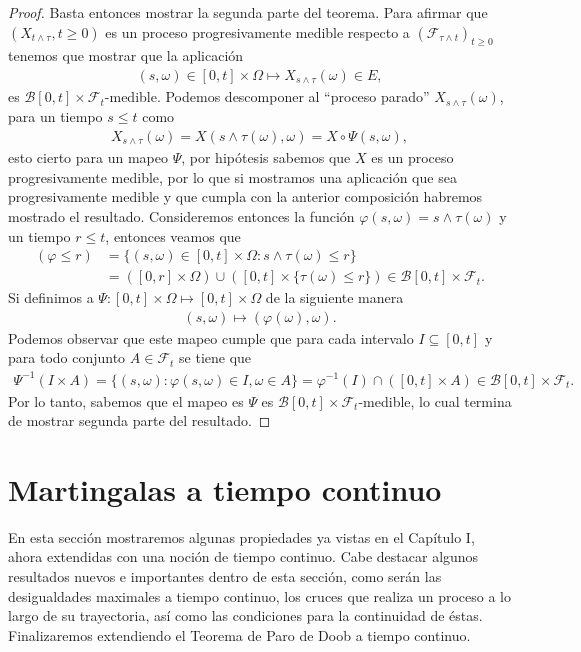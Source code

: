 \begin{proof}
Basta entonces mostrar la segunda parte del teorema. Para afirmar que $(X_{t \wedge \tau}, t \geq 0)$ es un proceso progresivamente medible respecto a $(\mathcal{F}_{\tau \wedge t})_{t \geq 0}$ tenemos que mostrar que la aplicación
\begin{align*}
	(s, \omega) \in [0, t] \times \Omega \mapsto X_{s \wedge \tau} (\omega) \in E,
\end{align*}
es $\mathcal{B}[0, t] \times \mathcal{F}_t$-medible. Podemos descomponer al ``proceso parado'' $X_{s \wedge \tau} (\omega)$, para un tiempo $s \leq t$ como
\begin{align*}
	X_{s \wedge \tau} (\omega) = X(s \wedge \tau (\omega), \omega) = X \circ \Psi (s, \omega),
\end{align*}
esto cierto para un mapeo $\Psi$, por hipótesis sabemos que $X$ es un proceso progresivamente medible, por lo que si mostramos una aplicación que sea progresivamente medible y que cumpla con la anterior composición habremos mostrado el resultado. Consideremos entonces la función $\varphi (s, \omega) = s \wedge \tau(\omega)$ y un tiempo $r \leq t$, entonces veamos que 
\begin{align*}
	(\varphi \leq r) & = \{ (s, \omega) \in [0, t] \times \Omega : s \wedge \tau(\omega) \leq r \} \\
    & = ([0, r] \times \Omega) \cup ([0, t] \times \{ \tau (\omega) \leq r \}) \in \mathcal{B}[0, t] \times \mathcal{F}_t.
\end{align*}
Si definimos a $\Psi: [0, t] \times \Omega \mapsto [0, t] \times \Omega$ de la siguiente manera
\begin{align*}
	(s, \omega) \mapsto (\varphi(\omega), \omega).
\end{align*}
Podemos observar que este mapeo cumple que para cada intervalo $I \subseteq [0, t]$ y para todo conjunto $A \in \mathcal{F}_t$ se tiene que
\begin{align*}
	\Psi^{-1}(I \times A) = \{ (s, \omega) : \varphi(s, \omega) \in I, \omega \in A \} = \varphi^{-1}(I) \cap ([0, t] \times A) \in \mathcal{B}[0, t] \times \mathcal{F}_t.
\end{align*}
Por lo tanto, sabemos que el mapeo es $\Psi$ es $\mathcal{B}[0, t] \times \mathcal{F}_t$-medible, lo cual termina de mostrar segunda parte del resultado.
\end{proof}

\section{Martingalas a tiempo continuo}
En esta sección mostraremos algunas propiedades ya vistas en el Capítulo I, ahora extendidas con una noción de tiempo continuo. Cabe destacar algunos resultados nuevos e importantes dentro de esta sección, como serán las desigualdades maximales a tiempo continuo, los cruces que realiza un proceso a lo largo de su trayectoria, así como las condiciones para la continuidad de éstas. Finalizaremos extendiendo el Teorema de Paro de Doob a tiempo continuo. \\

